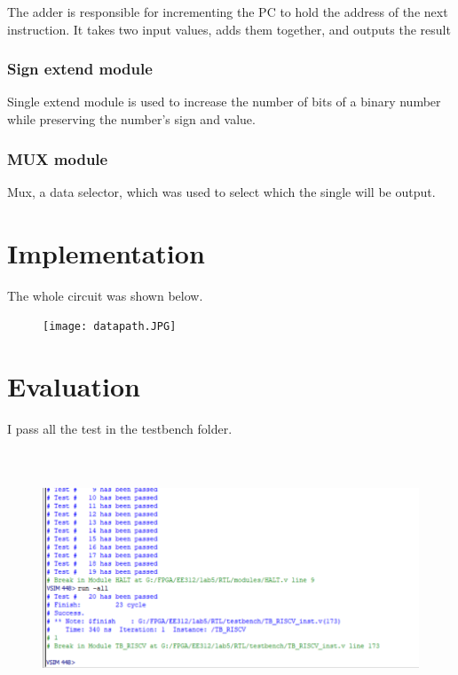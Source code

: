 \documentclass[12pt,a4paper]{article}
\begin{document}
The adder is responsible for incrementing the PC to hold the address of the next instruction.
It takes two input values, adds them together, and outputs the result

\subsubsection{Sign extend module}

Single extend module is used to increase the number of bits of a binary number while preserving the number's sign and value. 

\subsubsection{MUX module}

Mux, a data selector, which was used to select which the single will be output.

\newpage

\section{Implementation}

The whole circuit was shown below.

\begin{figure}[H]
  \centering
  \texttt{[image: datapath.JPG]}
  \end{figure}
\newpage

\section{Evaluation}

I pass all the test in the testbench folder.

\begin{figure}[H]
  \centering
  \includegraphics[height=3in]{inst.png}
  \end{figure}
\end{document}
